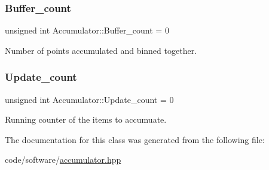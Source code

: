 \subsubsection{\texorpdfstring{Buffer\+\_\+count}{Buffer\_count}}
{\footnotesize\ttfamily unsigned int Accumulator\+::\+Buffer\+\_\+count = 0}



Number of points accumulated and binned together. 

\mbox{\label{classAccumulator_afb010cbe82265d22e5d577033574a16b}} 
\subsubsection{\texorpdfstring{Update\+\_\+count}{Update\_count}}
{\footnotesize\ttfamily unsigned int Accumulator\+::\+Update\+\_\+count = 0\hspace{0.3cm}{\ttfamily [private]}}



Running counter of the items to accumuate. 



The documentation for this class was generated from the following file\+:\begin{DoxyCompactItemize}
\item 
code/software/\hyperlink{accumulator_8hpp}{accumulator.\+hpp}\end{DoxyCompactItemize}
